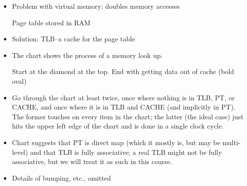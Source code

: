 \begin{frame}[fragile]
\begin{itemize}
\item Problem with virtual memory: doubles memory accesses

  Page table stored in RAM
\item Solution: TLB--a cache for the page table
\end{itemize}
\BNotes\ifnum{}
\begin{itemize}
\item The chart shows the process of a memory look up.

  Start at the diamond at the top.  End with getting data out of cache (bold oval)
\item Go through the chart at least twice, once where nothing is in TLB, PT, or CACHE, and once where it is in TLB and CACHE (and implicitly in PT).  The former touches on every item in the chart; the latter (the ideal case) just hits the upper left edge of the chart and is done in a single clock cycle.
\item Chart suggests that PT is direct map (which it mostly is, but may be
  multi-level) and that TLB is fully associative; a real TLB might not be
  fully associative, but we will treat it as such in this course.
  \item Details of bumping, etc., omitted
\end{itemize}
\fi\ENotes
\end{frame}





